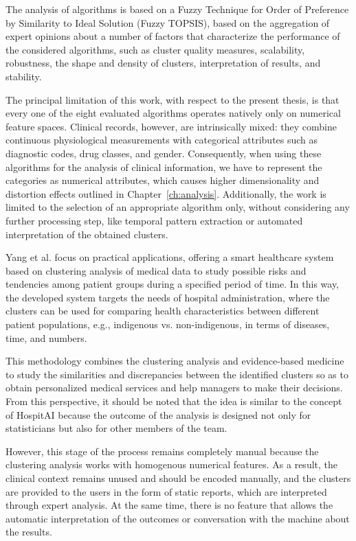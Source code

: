 The analysis of algorithms is based on a Fuzzy Technique for Order of Preference by Similarity to Ideal Solution (Fuzzy TOPSIS), based on the aggregation of expert opinions about a number of factors that characterize the performance of the considered algorithms, such as cluster quality measures, scalability, robustness, the shape and density of clusters, interpretation of results, and stability.

The principal limitation of this work, with respect to the present thesis, is that every one of the eight evaluated algorithms operates natively only on numerical feature spaces. Clinical records, however, are intrinsically mixed: they combine continuous physiological measurements with categorical attributes such as diagnostic codes, drug classes, and gender. Consequently, when using these algorithms for the analysis of clinical information, we have to represent the categories as numerical attributes, which causes higher dimensionality and distortion effects outlined in Chapter~\ref{ch:analysis}. Additionally, the work is limited to the selection of an appropriate algorithm only, without considering any further processing step, like temporal pattern extraction or automated interpretation of the obtained clusters.

Yang et al. \cite{yang2024} focus on practical applications, offering a smart healthcare system based on clustering analysis of medical data to study possible risks and tendencies among patient groups during a specified period of time. In this way, the developed system targets the needs of hospital administration, where the clusters can be used for comparing health characteristics between different patient populations, e.g., indigenous vs. non-indigenous, in terms of diseases, time, and numbers.

This methodology combines the clustering analysis and evidence-based medicine to study the similarities and discrepancies between the identified clusters so as to obtain personalized medical services and help managers to make their decisions. From this perspective, it should be noted that the idea is similar to the concept of HospitAI because the outcome of the analysis is designed not only for statisticians but also for other members of the team.

However, this stage of the process remains completely manual because the clustering analysis works with homogenous numerical features. As a result, the clinical context remains unused and should be encoded manually, and the clusters are provided to the users in the form of static reports, which are interpreted through expert analysis. At the same time, there is no feature that allows the automatic interpretation of the outcomes or conversation with the machine about the results.

